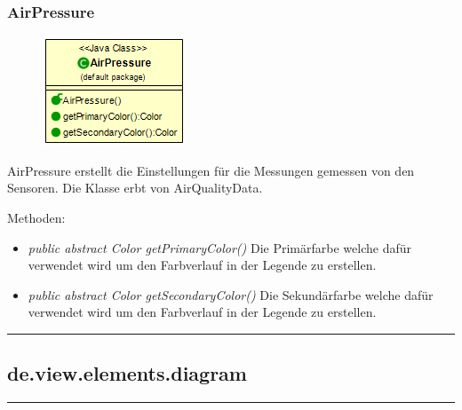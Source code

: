\subsubsection{AirPressure}
\begin{minipage}{0.3\textwidth}
    \begin{figure}[H]
        {\centering\includegraphics[scale = 0.6
        ]{media/view/airquality/AirPressure_Class.png}}
    \end{figure}
    \end{minipage} \hfill
    \begin{minipage}{0.6\textwidth}
AirPressure erstellt die Einstellungen für die Messungen gemessen von den Sensoren. Die Klasse erbt von AirQualityData.
\end{minipage}
Methoden: \begin{itemize} [noitemsep]
    \item \emph{public abstract Color getPrimaryColor()} Die Primärfarbe welche dafür verwendet wird um den Farbverlauf in der Legende zu erstellen.
    \item \emph{public abstract Color getSecondaryColor()} Die Sekundärfarbe welche dafür verwendet wird um den Farbverlauf in der Legende zu erstellen.
\end{itemize}


\rule{\textwidth}{0.4pt}
\subsection{de.view.elements.diagram}

\rule{\textwidth}{0.4pt}
